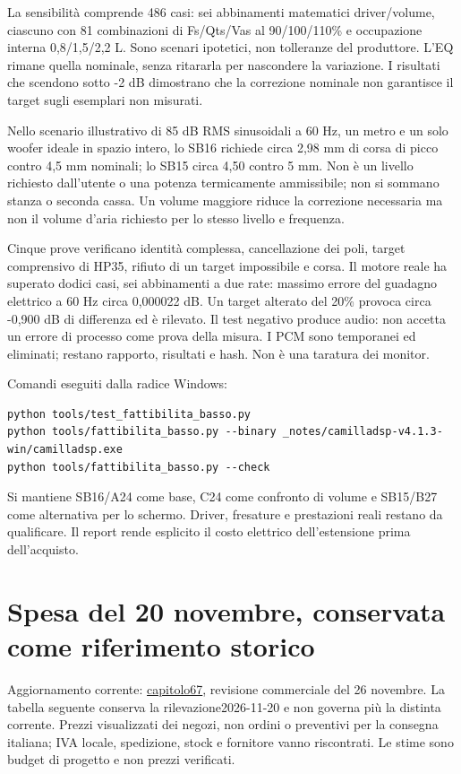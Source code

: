 \documentclass[
  italian,
  11pt,
  a4paper,
]{article}
\begin{document}
La sensibilità comprende 486 casi: sei abbinamenti matematici driver/volume, ciascuno con 81
combinazioni di Fs/Qts/Vas al 90/100/110\% e occupazione interna 0,8/1,5/2,2 L. Sono scenari
ipotetici, non tolleranze del produttore. L'EQ rimane quella nominale, senza ritararla per
nascondere la variazione. I risultati che scendono sotto -2 dB dimostrano che la correzione
nominale non garantisce il target sugli esemplari non misurati.

Nello scenario illustrativo di 85 dB RMS sinusoidali a 60 Hz, un metro e un solo woofer
ideale in spazio intero, lo SB16 richiede circa 2,98 mm di corsa di picco contro 4,5 mm
nominali; lo SB15 circa 4,50 contro 5 mm. Non è un livello richiesto dall'utente o una
potenza termicamente ammissibile; non si sommano stanza o seconda cassa. Un volume maggiore
riduce la correzione necessaria ma non il volume d'aria richiesto per lo stesso livello e
frequenza.

Cinque prove verificano identità complessa, cancellazione dei poli, target comprensivo di
HP35, rifiuto di un target impossibile e corsa. Il motore reale ha superato dodici casi, sei
abbinamenti a due rate: massimo errore del guadagno elettrico a 60 Hz circa 0,000022 dB. Un
target alterato del 20\% provoca circa -0,900 dB di differenza ed è rilevato. Il test
negativo produce audio: non accetta un errore di processo come prova della misura. I PCM
sono temporanei ed eliminati; restano rapporto, risultati e hash. Non è una taratura dei
monitor.

Comandi eseguiti dalla radice Windows:

\begin{lstlisting}
python tools/test_fattibilita_basso.py
python tools/fattibilita_basso.py --binary _notes/camilladsp-v4.1.3-win/camilladsp.exe
python tools/fattibilita_basso.py --check
\end{lstlisting}

Si mantiene SB16/A24 come base, C24 come confronto di volume e SB15/B27 come alternativa per
lo schermo. Driver, fresature e prestazioni reali restano da qualificare. Il report rende
esplicito il costo elettrico dell'estensione prima dell'acquisto.

\section{Spesa del 20 novembre, conservata come riferimento
storico}\label{spesa-del-20-novembre-conservata-come-riferimento-storico}

Aggiornamento corrente:
\href{../../docs/67-catena-di-riferimento-e-dipendenze-esecutive.md}{capitolo67}, revisione
commerciale del 26 novembre. La tabella seguente conserva la rilevazione2026-11-20 e non
governa più la distinta corrente. Prezzi visualizzati dei negozi, non ordini o preventivi
per la consegna italiana; IVA locale, spedizione, stock e fornitore vanno riscontrati. Le
stime sono budget di progetto e non prezzi verificati.
\end{document}

